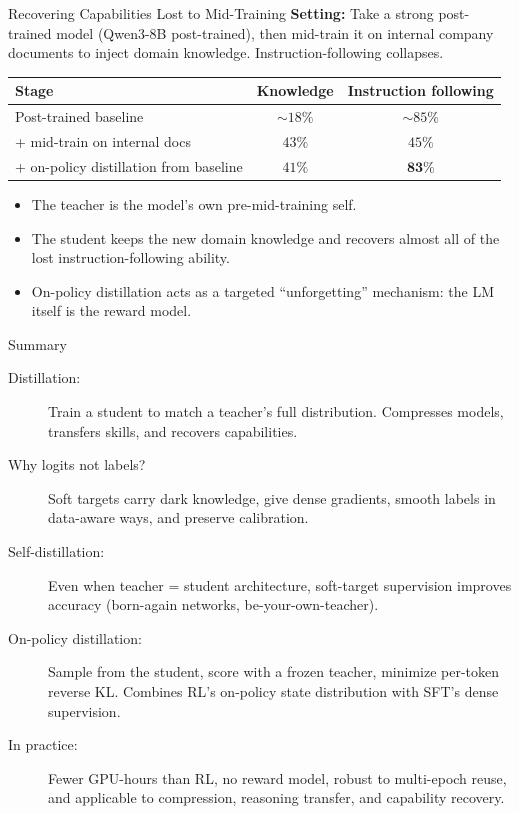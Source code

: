 \begin{frame}{Recovering Capabilities Lost to Mid-Training}
  \textbf{Setting:} Take a strong post-trained model (Qwen3-8B post-trained), then mid-train it on internal company documents to inject domain knowledge. Instruction-following collapses.

  \vspace{0.3em}
  \begin{center}
  \renewcommand{\arraystretch}{1.15}
  \begin{tabular}{l c c}
    \toprule
    \textbf{Stage} & \textbf{Knowledge} & \textbf{Instruction following} \\
    \midrule
    Post-trained baseline                       & $\sim 18\%$ & $\sim 85\%$ \\
    + mid-train on internal docs                & $43\%$      & $45\%$      \\
    \rowcolor{green!10}
    + on-policy distillation from baseline      & $41\%$      & $\mathbf{83\%}$ \\
    \bottomrule
  \end{tabular}
  \end{center}

  \vspace{0.3em}
  \begin{itemize}[nosep]
    \item The teacher is the model's own pre-mid-training self.
    \item The student keeps the new domain knowledge and recovers almost all of the lost instruction-following ability.
    \item On-policy distillation acts as a targeted ``unforgetting'' mechanism: the LM itself is the reward model.
  \end{itemize}
\end{frame}

\begin{frame}{Summary}
  \begin{description}
    \item[Distillation:] Train a student to match a teacher's full distribution. Compresses models, transfers skills, and recovers capabilities.
    \item[Why logits not labels?] Soft targets carry dark knowledge, give dense gradients, smooth labels in data-aware ways, and preserve calibration.
    \item[Self-distillation:] Even when teacher = student architecture, soft-target supervision improves accuracy (born-again networks, be-your-own-teacher).
    \item[On-policy distillation:] Sample from the student, score with a frozen teacher, minimize per-token reverse KL. Combines RL's on-policy state distribution with SFT's dense supervision.
    \item[In practice:] Fewer GPU-hours than RL, no reward model, robust to multi-epoch reuse, and applicable to compression, reasoning transfer, and capability recovery.
  \end{description}
\end{frame}
